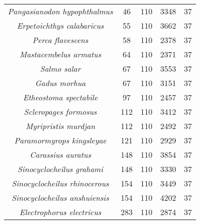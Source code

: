 \begin{longtable}[c]{|c|c|c|c|c|}
\textit{Pangasianodon hypophthalmus}   & 46  & 110 & 3348 & 37 \\
\textit{Erpetoichthys calabaricus}     & 55  & 110 & 3662 & 37 \\
\textit{Perca flavescens}              & 58  & 110 & 2378 & 37 \\
\textit{Mastacembelus armatus}         & 64  & 110 & 2371 & 37 \\
\textit{Salmo salar}                   & 67  & 110 & 3553 & 37 \\
\textit{Gadus morhua}                  & 67  & 110 & 3151 & 37 \\
\textit{Etheostoma spectabile}         & 97  & 110 & 2457 & 37 \\
\textit{Scleropages formosus}          & 112 & 110 & 3412 & 37 \\
\textit{Myripristis murdjan}           & 112 & 110 & 2492 & 37 \\
\textit{Paramormyrops kingsleyae}      & 121 & 110 & 2929 & 37 \\
\textit{Carassius auratus}             & 148 & 110 & 3854 & 37 \\
\textit{Sinocyclocheilus grahami}      & 148 & 110 & 3330 & 37 \\
\textit{Sinocyclocheilus rhinocerous}  & 154 & 110 & 3449 & 37 \\
\textit{Sinocyclocheilus anshuiensis}  & 154 & 110 & 4202 & 37 \\
\textit{Electrophorus electricus}      & 283 & 110 & 2874 & 37 \\ \hline
\end{longtable}


